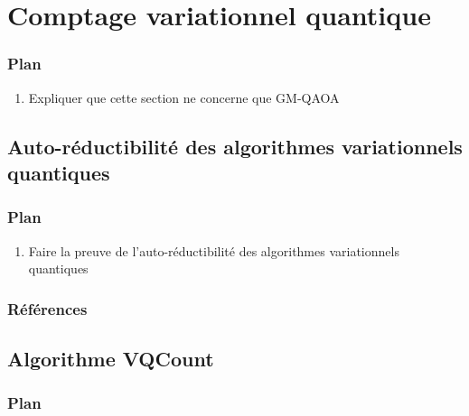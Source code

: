 \begin{comment}
\end{comment}

\chapter{Comptage variationnel quantique}


\subsection*{Plan}

\begin{enumerate}
    \item Expliquer que cette section ne concerne que GM-QAOA
\end{enumerate}


\section{Auto-réductibilité des algorithmes variationnels quantiques}

\subsection*{Plan}

\begin{enumerate}
    \item Faire la preuve de l'auto-réductibilité des algorithmes variationnels quantiques
\end{enumerate}

\subsection*{Références}


\section{Algorithme VQCount}

\subsection*{Plan}

